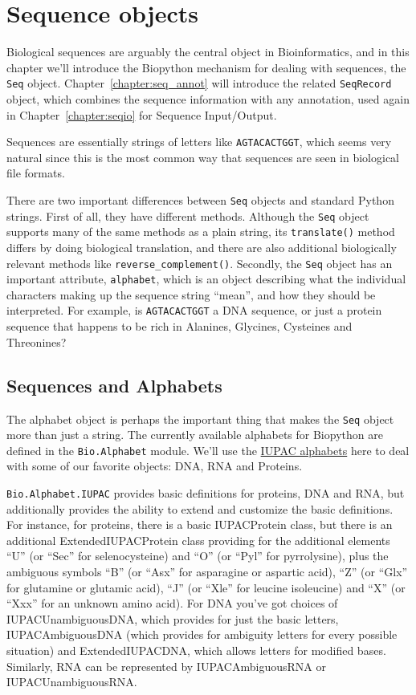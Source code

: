 \chapter{Sequence objects}
\label{chapter:seq_objects}

Biological sequences are arguably the central object in Bioinformatics, and in this chapter we'll introduce the Biopython mechanism for dealing with sequences, the \verb|Seq| object.
Chapter~\ref{chapter:seq_annot} will introduce the related \verb|SeqRecord| object, which combines the sequence information with any annotation, used again in Chapter~\ref{chapter:seqio} for Sequence Input/Output.

Sequences are essentially strings of letters like \verb|AGTACACTGGT|, which seems very natural since this is the most common way that sequences are seen in biological file formats.

There are two important differences between \verb|Seq| objects and standard Python strings.
First of all, they have different methods.  Although the \verb|Seq| object supports many of the same methods as a plain string, its \verb|translate()| method differs by doing biological translation, and there are also additional biologically relevant methods like \verb|reverse_complement()|.
Secondly, the \verb|Seq| object has an important attribute, \verb|alphabet|, which is an object describing what the individual characters making up the sequence string ``mean'', and how they should be interpreted.  For example, is \verb|AGTACACTGGT| a DNA sequence, or just a protein sequence that happens to be rich in Alanines, Glycines, Cysteines
and Threonines?

\section{Sequences and Alphabets}

The alphabet object is perhaps the important thing that makes the \verb|Seq| object more than just a string. The currently available alphabets for Biopython are defined in the \verb|Bio.Alphabet| module. We'll use the \href{http://www.sbcs.qmul.ac.uk/iupac/}{IUPAC alphabets} here to deal with some of our favorite objects: DNA, RNA and Proteins.

\verb|Bio.Alphabet.IUPAC| provides basic definitions for proteins, DNA and RNA, but additionally provides the ability to extend and customize the basic definitions. For instance, for proteins, there is a basic IUPACProtein class, but there is an additional ExtendedIUPACProtein class providing for the additional elements ``U'' (or ``Sec'' for selenocysteine) and ``O'' (or ``Pyl'' for pyrrolysine), plus the ambiguous symbols ``B'' (or ``Asx'' for asparagine or aspartic acid), ``Z'' (or ``Glx'' for glutamine or glutamic acid), ``J'' (or ``Xle'' for leucine isoleucine) and ``X'' (or ``Xxx'' for an unknown amino acid). For DNA you've got choices of IUPACUnambiguousDNA, which provides for just the basic letters, IUPACAmbiguousDNA (which provides for ambiguity letters for every possible situation) and ExtendedIUPACDNA, which allows letters for modified bases. Similarly, RNA can be represented by IUPACAmbiguousRNA or IUPACUnambiguousRNA.

